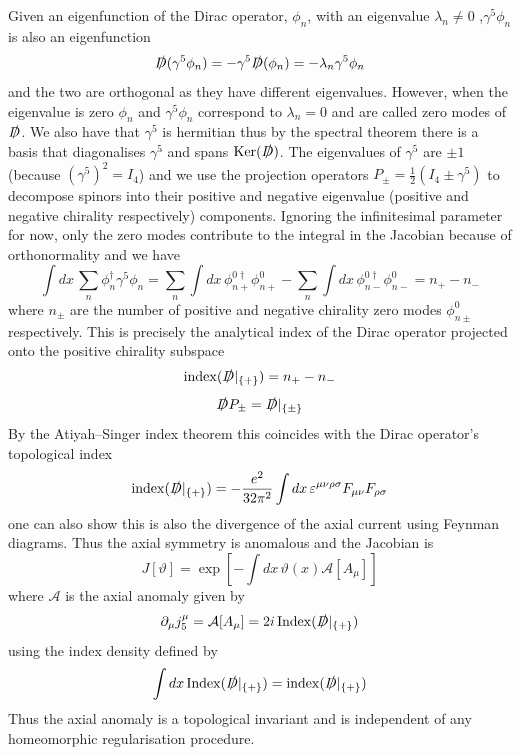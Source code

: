 \documentclass[11pt, a4paper]{article}
\theoremstyle{definition}
\theoremstyle{plain}
\begin{document}
Given an eigenfunction of the Dirac operator, $\phi_n$, with an eigenvalue $\lambda_n \neq 0$ 
,$\gamma^5\phi_n$ is also an eigenfunction
\begin{equation}
  \slashed{D}(\gamma^5\phi_n) = -\gamma^5\slashed{D}(\phi_n) = -\lambda_n\gamma^5\phi_n
\end{equation}
and the two are orthogonal as they have different eigenvalues.
However, when the eigenvalue is zero $\phi_n$ and $\gamma^5\phi_n$ correspond to $\lambda_n = 0$
and are called zero modes of $\slashed{D}$. We also have that $\gamma^5$ is 
hermitian thus by the spectral theorem there is a basis that diagonalises $\gamma^5$
and spans $\mathrm{Ker}(\slashed{D})$. The eigenvalues of $\gamma^5$ are $\pm 1$
(because ${(\gamma^5)}^2 = I_4$) and we use the projection
operators $P_\pm = \frac{1}{2}(I_4 \pm \gamma^5)$ to decompose
spinors into their positive and negative eigenvalue (positive and negative chirality respectively)
components. Ignoring the infinitesimal parameter for now, only the zero modes contribute
to the integral in the Jacobian because of orthonormality and we have
\begin{equation}
  \int{dx\, \sum_n{\phi^\dagger_n\gamma^5\phi_n}}
  = \sum_n{\int{dx\,\phi^{0\dagger}_{n+}\phi^0_{n+}}}
  -\sum_n{\int{dx\,\phi^{0\dagger}_{n-}\phi^0_{n-}}} = n_+ - n_-
\end{equation}
where $n_\pm$ are the number of positive and negative chirality zero modes $\phi^0_{n\pm}$
respectively. This is precisely the analytical index of the Dirac operator 
projected onto the positive chirality subspace
\begin{equation}
  \mathrm{index}(\slashed{D}|_{\{+\}}) = n_+ - n_- 
\end{equation}
\begin{equation}
  \slashed{D}P_{\pm} = \slashed{D}|_{\{\pm\}} 
\end{equation}
By the Atiyah–Singer index theorem this coincides with the Dirac operator's 
topological index
\begin{equation}
  \mathrm{index}(\slashed{D}|_{\{+\}}) = - \frac{e^2}{32\pi^2}\int{dx\,
  \varepsilon^{\mu\nu\rho\sigma}F_{\mu\nu}F_{\rho\sigma}}
\end{equation}
one can also show this is also the divergence of the axial current using Feynman diagrams.
Thus the axial symmetry is anomalous and the Jacobian is
\begin{equation}
  J[\vartheta] = \exp{\left[-\int{dx\,\vartheta(x)\mathcal{A}[A_\mu]}\right]}
\end{equation}
where $\mathcal{A}$ is the axial anomaly given by
\begin{equation}
  \partial_\mu j^\mu_5 = \mathcal{A}[A_\mu] = 2i\,\mathrm{Index}(\slashed{D}|_{\{+\}})
\end{equation}
using the index density defined by
\begin{equation}
  \int{dx\, \mathrm{Index}(\slashed{D}|_{\{+\}})} = \mathrm{index}(\slashed{D}|_{\{+\}})
\end{equation}
Thus the axial anomaly is a topological invariant
and is independent of any homeomorphic regularisation procedure.


\newpage


\end{document}
